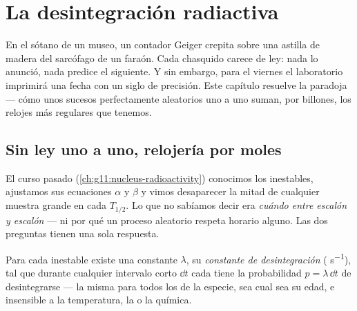 \chapter{La desintegración radiactiva}\label{ch:g12:radioactive-decay}

En el sótano de un museo, un contador Geiger crepita sobre una astilla de madera del
sarcófago de un faraón. Cada chasquido carece de ley: nada lo anunció, nada predice el
siguiente. Y sin embargo, para el viernes el laboratorio imprimirá una fecha con un
siglo de precisión. Este capítulo resuelve la paradoja --- cómo unos sucesos
perfectamente aleatorios uno a uno suman, por billones, los relojes más regulares que
tenemos.

\section{Sin ley uno a uno, relojería por moles}

El curso pasado (\cref{ch:g11:nucleus-radioactivity}) conocimos los 
inestables, ajustamos sus ecuaciones $\alpha$ y $\beta$ y vimos desaparecer la mitad
de cualquier muestra grande en cada  $T_{1/2}$. Lo que no
sabíamos decir era \emph{cuándo entre escalón y escalón} --- ni por qué un proceso
aleatorio respeta horario alguno. Las dos preguntas tienen una sola respuesta.

\begin{definition}\label{def:g12:radioactive-decay:lambda}
Para cada  inestable existe una constante $\lambda$, su \emph{constante de
desintegración} ( \unit{s^{-1}}), tal que
durante cualquier intervalo corto $\dd t$ cada  tiene la probabilidad
$p = \lambda\,\dd t$ de desintegrarse --- la misma para todos los  de la
especie, sea cual sea su edad, e insensible a la temperatura, la  o la química.
\end{definition}

